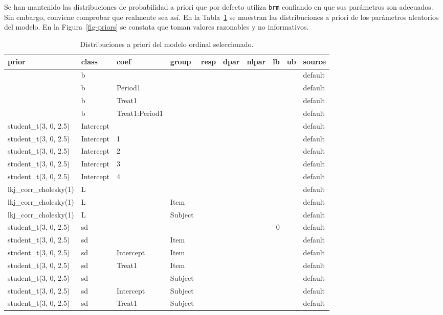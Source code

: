 \documentclass[
  12pt,
  a4paper,
  extrafontsizes,
  onecolumn,
  openright,
  table]{memoir}
\begin{document}
Se han mantenido las distribuciones de probabilidad a priori que por
defecto utiliza \texttt{brm} confiando en que sus parámetros son
adecuados. Sin embargo, conviene comprobar que realmente sea así. En la
Tabla~\ref{tbl-priors} se muestran las distribuciones a priori de los
parámetros aleatorios del modelo. En la Figura~\ref{fig-priors} se
constata que toman valores razonables y no informativos.

\tiny

\hypertarget{tbl-priors}{}
\begin{longtable}{llllrrrrrl}
\caption{\label{tbl-priors}Distribuciones a priori del modelo ordinal seleccionado. }\tabularnewline

\toprule
prior & class & coef & group & resp & dpar & nlpar & lb & ub & source \\ 
\midrule
 & b &  &  &  &  &  &  &  & default \\ 
 & b & Period1 &  &  &  &  &  &  & default \\ 
 & b & Treat1 &  &  &  &  &  &  & default \\ 
 & b & Treat1:Period1 &  &  &  &  &  &  & default \\ 
student\_t(3, 0, 2.5) & Intercept &  &  &  &  &  &  &  & default \\ 
student\_t(3, 0, 2.5) & Intercept & 1 &  &  &  &  &  &  & default \\ 
student\_t(3, 0, 2.5) & Intercept & 2 &  &  &  &  &  &  & default \\ 
student\_t(3, 0, 2.5) & Intercept & 3 &  &  &  &  &  &  & default \\ 
student\_t(3, 0, 2.5) & Intercept & 4 &  &  &  &  &  &  & default \\ 
lkj\_corr\_cholesky(1) & L &  &  &  &  &  &  &  & default \\ 
lkj\_corr\_cholesky(1) & L &  & Item &  &  &  &  &  & default \\ 
lkj\_corr\_cholesky(1) & L &  & Subject &  &  &  &  &  & default \\ 
student\_t(3, 0, 2.5) & sd &  &  &  &  &  & 0 &  & default \\ 
student\_t(3, 0, 2.5) & sd &  & Item &  &  &  &  &  & default \\ 
student\_t(3, 0, 2.5) & sd & Intercept & Item &  &  &  &  &  & default \\ 
student\_t(3, 0, 2.5) & sd & Treat1 & Item &  &  &  &  &  & default \\ 
student\_t(3, 0, 2.5) & sd &  & Subject &  &  &  &  &  & default \\ 
student\_t(3, 0, 2.5) & sd & Intercept & Subject &  &  &  &  &  & default \\ 
student\_t(3, 0, 2.5) & sd & Treat1 & Subject &  &  &  &  &  & default \\ 
\bottomrule
\end{longtable}
\end{document}
